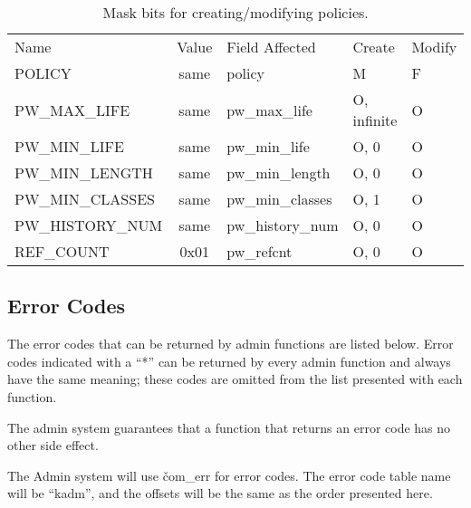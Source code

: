 \begin{table}[htbp]
\begin{tabular}{@{}lclll}
Name & Value & Field Affected & Create & Modify \\
POLICY & same & policy & M & F \\
PW_MAX_LIFE & same & pw_max_life & O, infinite & O \\
PW_MIN_LIFE & same & pw_min_life & O, 0 & O \\
PW_MIN_LENGTH & same & pw_min_length & O, 0 & O \\
PW_MIN_CLASSES & same & pw_min_classes & O, 1 & O \\
PW_HISTORY_NUM & same & pw_history_num & O, 0 & O \\
REF_COUNT & 0x01 & pw_refcnt & O, 0 & O 
\end{tabular}
\caption{Mask bits for creating/modifying policies.}
\label{tab:policy-bits}
\end{table}

\subsection{Error Codes}

The error codes that can be returned by admin functions are listed
below.  Error codes indicated with a ``*'' can be returned by every
admin function and always have the same meaning; these codes are
omitted from the list presented with each function.  

The admin system guarantees that a function that returns an error code
has no other side effect.

The Admin system will use \v{com_err} for error codes.  The error code
table name will be ``kadm'', and the offsets will be the same as the
order presented here.

